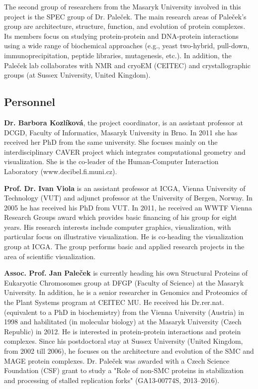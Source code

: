 \documentclass[11pt,a4paper,titlepage,oneside,onecolumn]{article}
\begin{document}
The second group of researchers from the Masaryk University involved in this project is the SPEC group of Dr. Pale\v{c}ek. 
The main research areas of Pale\v{c}ek's group are architecture, structure, function, and evolution of protein complexes.
Its members focus on studying protein-protein and DNA-protein interactions using a wide range of biochemical approaches (e.g., yeast two-hybrid, pull-down, immunoprecipitation, peptide libraries, mutagenesis, etc.). 
In addition, the Pale\v{c}ek lab collaborates with NMR and cryoEM (CEITEC) and crystallographic groups (at Sussex University, United Kingdom). 

\subsection{Personnel}

\textbf{Dr. Barbora Kozl\'{i}kov\'{a}}, the project coordinator, is an assistant professor at DCGD, Faculty of Informatics, Masaryk University in Brno. In 2011 she has received her PhD from the same university. She focuses mainly on the interdisciplinary CAVER project which integrates computational geometry and visualization. She is the co-leader of the Human-Computer Interaction Laboratory (www.decibel.fi.muni.cz). 

\textbf{Prof. Dr. Ivan Viola} is an assistant professor at ICGA, Vienna University of Technology (VUT) and adjunct professor at the University of Bergen, Norway. In 2005 he has received his PhD from VUT. In 2011, he received an WWTF Vienna Research Groups award which provides basic financing of his group for eight years. His research interests include computer graphics, visualization, with particular focus on illustrative visualization. He is co-heading the visualization group at ICGA. The group performs basic and applied research projects in the area of scientific visualization. 

\textbf{Assoc. Prof. Jan Pale\v{c}ek} is currently heading his own Structural Proteins of Eukaryotic Chromosomes group at  DFGP (Faculty of Science) at the Masaryk University. 
In addition, he is a senior researcher in Genomics and Proteomics of the Plant Systems program at CEITEC MU. 
He received his Dr.rer.nat. (equivalent to a PhD in biochemistry) from the Vienna University (Austria) in 1998 and habilitated (in molecular biology) at the Masaryk University (Czech Republic) in 2012. 
He is interested in protein-protein interactions and protein complexes. 
Since his postdoctoral stay at Sussex University (United Kingdom, from 2002 till 2006), he focuses on the architecture and evolution of the SMC and MAGE protein complexes. 
Dr. Pale\v{c}ek was awarded with a Czech Science Foundation (CSF) grant to study a "Role of non-SMC proteins in stabilization and processing of stalled replication forks" (GA13-00774S, 2013--2016).
\end{document}
